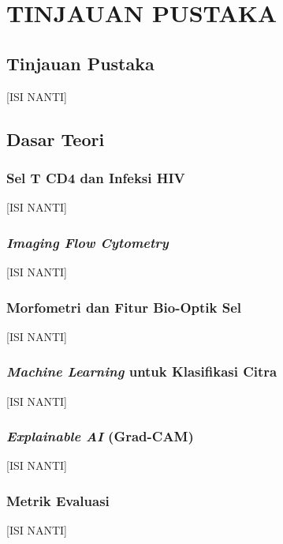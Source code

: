\chapter{TINJAUAN PUSTAKA}\label{pustaka}

\section{Tinjauan Pustaka}\label{tinjauan-pustaka}
[ISI NANTI]

\section{Dasar Teori}\label{dasar-teori}

\subsection{Sel T CD4 dan Infeksi HIV}
[ISI NANTI]

\subsection{\textit{Imaging Flow Cytometry}}
[ISI NANTI]

\subsection{Morfometri dan Fitur Bio-Optik Sel}
[ISI NANTI]

\subsection{\textit{Machine Learning} untuk Klasifikasi Citra}
[ISI NANTI]

\subsection{\textit{Explainable AI} (Grad-CAM)}
[ISI NANTI]

\subsection{Metrik Evaluasi}
[ISI NANTI]
